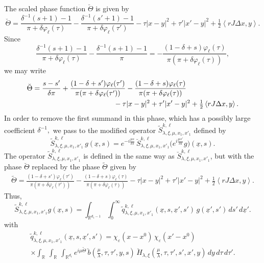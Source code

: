 \documentclass[leqno]{amsart}
\theoremstyle{definition}
\theoremstyle{remark}
\numberwithin{equation}{section}
\newcommand{\R}{\mathbb{R}}
\newcommand\la{{\lambda}}
\begin{document}
The scaled phase function $\breve \Theta$ is given by 
\[
\breve\Theta
 = \frac {\delta^{-1}(s+1)-1}{\pi + \delta \varphi_\ell(\tau)} - \frac {\delta^{-1}(s'+1)-1}{\pi + \delta \varphi_\ell(\tau')} - \tau| x-y|^2 + \tau'| x'-y|^2 + \tfrac 12 \left\langle rJ\Delta x,y\right\rangle.
\]
Since
\[
\frac {\delta^{-1}(s+1)-1}{\pi + \delta \varphi_\ell(\tau)}-\frac {\delta^{-1}(s+1)-1}{\pi}=
-\frac {(1-\delta+s)\varphi_\ell(\tau)}{\pi(\pi + \delta \varphi_\ell(\tau))},
\]
we may write
\begin{align*}
\breve\Theta
& = \frac{s-s'}{\delta \pi}+\frac {(1-\delta+s')\varphi_\ell(\tau')}{\pi(\pi + \delta \varphi_\ell(\tau'))}-\frac {(1-\delta+s)\varphi_\ell(\tau)}{\pi(\pi + \delta \varphi_\ell(\tau))}\\
 &\hskip4cm - \tau| x-y|^2 + \tau'| x'-y|^2 + \tfrac 12 \left\langle rJ\Delta x,y\right\rangle.
\end{align*}
In order to remove the first summand in this phase, which has a possibly large coefficient $\delta^{-1},$ we pass to the modified operator $\tilde S_{\lambda,\xi,\mu,x_1,x'_1}^{k,\ell}$ defined by 
\begin{equation}\label{Smutildeb}
\tilde S_{\lambda,\xi,\mu,x_1,x'_1}^{k,\ell} \, g(\underline x,s) = e^{-i\frac{\mu s}{\delta \pi}} \,\breve S_{\lambda,\xi,\mu,x_1,x'_1}^{k,\ell}\big(e^{i\frac{\mu s'}{\delta \pi}} g\big)(\underline x,s).
\end{equation}
The operator $\tilde S_{\lambda,\xi,\mu,x_1,x'_1}^{k,\ell}$ is defined  in the same way as $\breve S_{\lambda,\xi,\mu,x_1,x'_1}^{k,\ell}$, but with the phase $\breve \Theta$ replaced by  the phase $\tilde \Theta$ given by
\begin{align*}
\tilde \Theta  =
\frac {(1-\delta+s')\varphi_\ell(\tau')}{\pi(\pi + \delta \varphi_\ell(\tau'))}-\frac {(1-\delta+s)\varphi_\ell(\tau)}{\pi(\pi + \delta \varphi_\ell(\tau))} 
 - \tau| x-y|^2 + \tau'| x'-y|^2 + \tfrac 12 \left\langle rJ\Delta x,y\right\rangle.
\end{align*}
Thus, 
\[
\tilde S_{\lambda,\xi,\mu,x_1,x'_1}^{k,\ell} g(\underline x,s) = \int_{\R^{d_1-1}} \int_0^\infty \tilde q^{k,\ell}_{\lambda,\xi,\mu,x_1,x'_1}
(\underline x,s,\underline x',s') \, g(\underline x',s') \,ds'\,d\underline x'.
\]
with
\begin{multline*}
\tilde q^{k,\ell}_{\lambda,\xi,\mu,x_1,x'_1}
(\underline x,s,\underline x',s')
=
\chi_\varepsilon(x-x^0)\,
\chi_\varepsilon(x'-x^0)\\
\times
\int_\R\,\int_\R\,\int_{\R^{d_1}}
e^{i\mu\tilde\Theta}\,
\breve b(\tfrac\mu\la,\tau,\tau',y,s)\,
\breve H_{\la,\xi}
(\tfrac\mu\la,\tau,\tau',s',x',y)\,
dy\,d\tau\,d\tau'.
\end{multline*}
\end{document}
